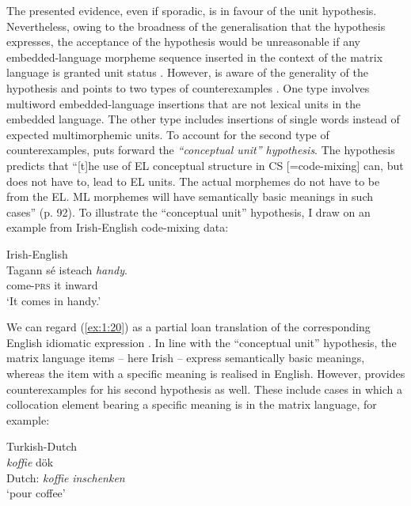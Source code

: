 The presented evidence, even if sporadic, is in favour of the unit hypothesis. Nevertheless, owing to the broadness of the generalisation that the hypothesis expresses, the acceptance of the hypothesis would be unreasonable if any embedded-language morpheme sequence inserted in the context of the matrix language is granted unit status \citep[cf.][42]{wray-2002}. However, \citet[91]{backus-units-2003} is aware of the generality of the hypothesis and points to two types of counterexamples \citep[also see][105--107]{backus-evidence-1999}. One type involves multiword embedded-language insertions that are not lexical units in the embedded language. The other type includes insertions of single words instead of expected multimorphemic units. To account for the second type of counterexamples, \citet{backus-units-2003} puts forward the \textit{``conceptual unit'' hypothesis}. The hypothesis predicts that ``[t]he use of EL conceptual structure in CS [=code-mixing] can, but does not have to, lead to EL units. The actual morphemes do not have to be from the EL. ML morphemes will have semantically basic meanings in such cases'' (p. 92). To illustrate the ``conceptual unit'' hypothesis, I draw on an example from Irish-English code-mixing data:

\ea
\label{ex:1:20}
Irish-English \citep[184]{stenson-1990}\\
\gll Tagann sé isteach \textit{handy}.\\
come-{\textsc{prs}} it inward {}\\
\glt `It comes in handy.'
\z

\noindent We can regard (\ref{ex:1:20}) as a partial loan translation of the corresponding English idiomatic expression \citep[184]{stenson-1990}. In line with the ``conceptual unit'' hypothesis, the matrix language items -- here Irish -- express semantically basic meanings, whereas the item with a specific meaning is realised in English. However, \citeauthor[]{backus-units-2003} provides counterexamples for his second hypothesis as well. These include cases in which a collocation element bearing a specific meaning is in the matrix language, for example:

\ea{}\label{ex:1:21}
Turkish-Dutch \citep[111]{backus-units-2003}\\
\gll {} \textit{koffie} dök\\
Dutch: \textit{koffie} \textit{inschenken}\\
 \hspace{7.5mm} `pour coffee'
\z

